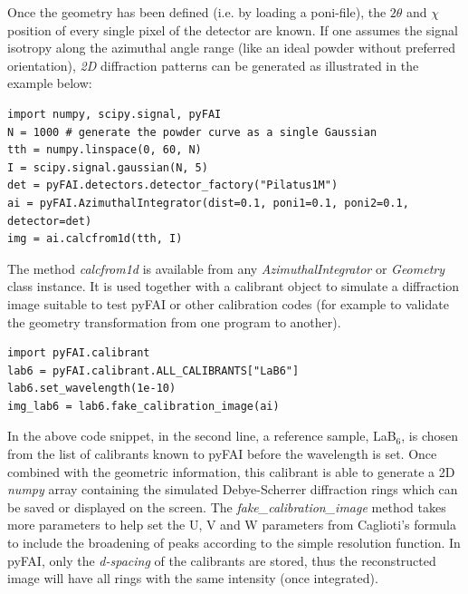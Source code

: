 \documentclass[preprint]{iucr}
\begin{document}
Once the geometry has been defined (i.e. by loading a poni-file), the $2\theta$
and $\chi$ position of every single pixel of the detector are known.
If one assumes the signal isotropy along the azimuthal angle range (like an
ideal powder without preferred orientation), \textit{2D} diffraction patterns can be
generated as illustrated in the example below:

\begin{verbatim}
import numpy, scipy.signal, pyFAI
N = 1000 # generate the powder curve as a single Gaussian
tth = numpy.linspace(0, 60, N)
I = scipy.signal.gaussian(N, 5)
det = pyFAI.detectors.detector_factory("Pilatus1M")
ai = pyFAI.AzimuthalIntegrator(dist=0.1, poni1=0.1, poni2=0.1, detector=det)
img = ai.calcfrom1d(tth, I)
\end{verbatim}


The method \textit{calcfrom1d} is available from any
\textit{AzimuthalIntegrator} or \textit{Geometry} class instance.
It is used together with a calibrant object to simulate a diffraction
image suitable to test pyFAI or other calibration codes (for example to
validate the geometry transformation from one program to another).


\begin{verbatim}
import pyFAI.calibrant
lab6 = pyFAI.calibrant.ALL_CALIBRANTS["LaB6"]
lab6.set_wavelength(1e-10)
img_lab6 = lab6.fake_calibration_image(ai)
\end{verbatim}

In the above code snippet, in the second line, a reference sample,
LaB$_6$, is chosen from the list of calibrants known to pyFAI before the
wavelength is set.
Once combined with the geometric information, this calibrant is able to
generate a 2D \textit{numpy} array containing the simulated Debye-Scherrer
diffraction rings which can be saved or displayed on the screen.
The \textit{fake\_calibration\_image} method takes more parameters to help set
the U, V and W parameters from Caglioti's formula \cite{caglioti} to include the
broadening of peaks according to the simple resolution function.
In pyFAI, only the \textit{d-spacing} of the calibrants are stored, thus the
reconstructed image will have all rings with the same intensity (once integrated).
\end{document}

